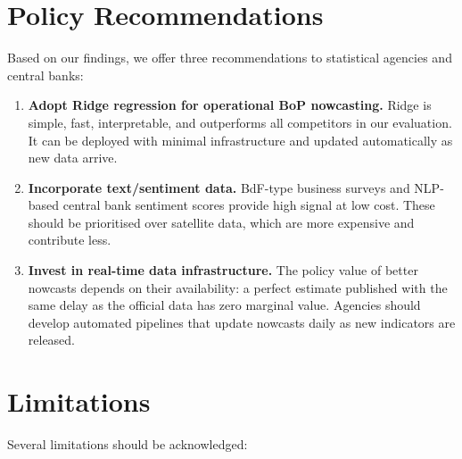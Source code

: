 \section*{Policy Recommendations}

Based on our findings, we offer three recommendations to statistical agencies and central banks:

\begin{enumerate}
  \item \textbf{Adopt Ridge regression for operational BoP nowcasting.}  Ridge is simple, fast, interpretable, and outperforms all competitors in our evaluation.  It can be deployed with minimal infrastructure and updated automatically as new data arrive.

  \item \textbf{Incorporate text/sentiment data.}  BdF-type business surveys and NLP-based central bank sentiment scores provide high signal at low cost.  These should be prioritised over satellite data, which are more expensive and contribute less.

  \item \textbf{Invest in real-time data infrastructure.}  The policy value of better nowcasts depends on their availability: a perfect estimate published with the same delay as the official data has zero marginal value.  Agencies should develop automated pipelines that update nowcasts daily as new indicators are released.
\end{enumerate}


\section*{Limitations}

Several limitations should be acknowledged:

